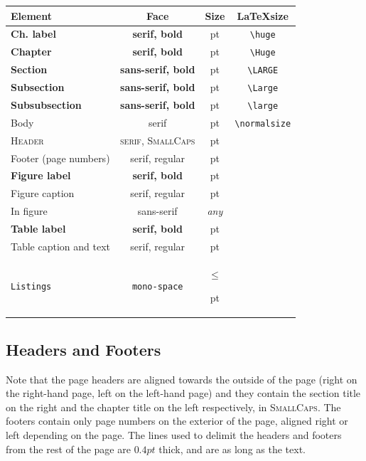 \documentclass[nofilelist]{cslthse-msc}
\makeatletter
\newcommand\thefontsize[1]{{#1 \f@size pt\par}}
\makeatother
\begin{document}
\begin{appendices}
\begin{table}[!hbt]
 \begin{tabular}{ l c c c}
\hline 
\textbf{Element} & \textbf{Face} & \textbf{Size}  & \textbf{\LaTeX size}  \\ 
\hline 
{\huge \textbf{Ch. label}} & {\huge \textbf{serif, bold}} & \thefontsize\huge & \verb+\huge+ \\ 
{\Huge \textbf{Chapter}} & {\Huge \textbf{serif, bold}} & \thefontsize\Huge & \verb+\Huge+ \\ 
{\LARGE \textsf{\textbf{Section}}} & {\Large \textsf{\textbf{sans-serif, bold}}} & \thefontsize\LARGE &  \verb+\LARGE+  \\ 
{\Large \textsf{\textbf{Subsection}}} & {\Large \textsf{\textbf{sans-serif, bold}}} & \thefontsize\Large & \verb+\Large+ \\ 
{\large \textsf{\textbf{Subsubsection}}} & {\Large \textsf{\textbf{sans-serif, bold}}} & \thefontsize\large &  \verb+\large+ \\ 
Body & serif & \thefontsize\normalsize & {\footnotesize \verb+\normalsize+} \\
{\footnotesize \textsc{Header}} & {\footnotesize \textsc{serif, SmallCaps}} & \thefontsize\footnotesize &  \\
Footer (page numbers) & serif, regular & \thefontsize\normalsize &  \\
\hline
\textbf{Figure label} & \textbf{serif, bold} & \thefontsize\normalsize & \\
Figure caption & serif, regular & \thefontsize\normalsize & \\
\textsf{In figure} & \textsf{sans-serif} & \textit{any} & \\
\textbf{Table label} & \textbf{serif, bold} & \thefontsize\normalsize & \\
Table caption and text & serif, regular & \thefontsize\normalsize & \\
\texttt{Listings} & \texttt{mono-space} & $\le$ \thefontsize\normalsize & \\
\hline 
\end{tabular} 
\end{table}

\subsection{Headers and Footers}
Note that the page headers are aligned towards the outside of the page (right on the right-hand page, left on the left-hand page) and they contain the section title on the right and the chapter title on the left respectively, in \textsc{SmallCaps}. The footers contain only page numbers on the exterior of the page, aligned right or left depending on the page. The lines used to delimit the headers and footers from the rest of the page are $0.4 pt$ thick, and are as long as the text.


\end{appendices}
\end{document}
